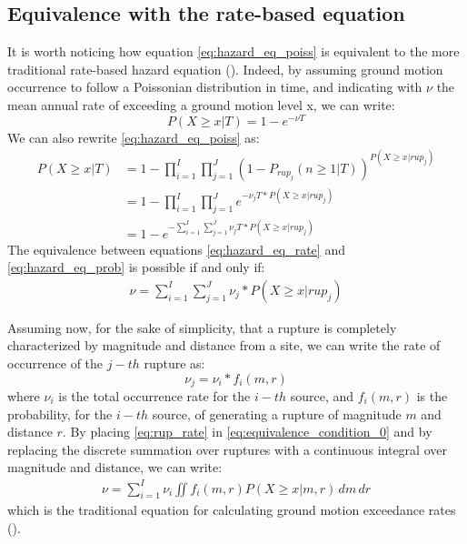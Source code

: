 \subsection{Equivalence with the rate-based equation}
It is worth noticing how equation \ref{eq:hazard_eq_poiss} is equivalent to the more traditional rate-based
hazard equation (\cite{mcguire1995}). Indeed, by assuming ground motion occurrence to follow a Poissonian
distribution in time, and indicating with $\nu$ the mean annual rate of exceeding a ground motion level x,
we can write:
\begin{equation}
\label{eq:hazard_eq_rate}
P(X \ge x | T) = 1 - e ^ {- \nu T}
\end{equation}
We can also rewrite \ref{eq:hazard_eq_poiss} as:
\begin{align}
\label{eq:hazard_eq_prob}
P(X \ge x | T) &= 1 - \prod_{i=1}^{I} \prod_{j=1}^{J} (1 - P_{rup_{j}}(n \ge 1 | T))^{P(X \ge x | rup_{j})} \nonumber \\
		      &= 1 - \prod_{i=1}^{I} \prod_{j=1}^{J} e^{-\nu_{j} T * P(X \ge x | rup_{j})} \nonumber \\
		      & = 1 - e ^ {- \sum_{i=1}^{I} \sum_{j=1}^{J} \nu_{j} T * P(X \ge x | rup_{j})}
\end{align}
The equivalence between equations \ref{eq:hazard_eq_rate} and \ref{eq:hazard_eq_prob} is possible if and only if:
\begin{align}
\label{eq:equivalence_condition_0}
\nu  =  \sum_{i=1}^{I} \sum_{j=1}^{J} \nu_{j} * P(X \ge x | rup_{j})
\end{align}

Assuming now, for the sake of simplicity, that a rupture is completely characterized by magnitude and distance from a site, we
can write the rate of occurrence of the $j-th$ rupture as:
\begin{equation}
\label{eq:rup_rate}
\nu_{j} = \nu_{i} * f_{i}(m, r)
\end{equation}
where $\nu_{i}$ is the total occurrence rate for the $i-th$ source, and $f_{i}(m, r)$ is the probability, for the $i-th$ source, of
generating a rupture of magnitude $m$ and distance $r$. By placing \ref{eq:rup_rate} in \ref{eq:equivalence_condition_0} and
by replacing the discrete summation over ruptures with a continuous integral over magnitude and distance, we can write:
\begin{align}
\nu = \sum_{i=1}^{I} \nu_{i} \iint f_{i}(m, r) P(X \ge x | m, r)\,dm \,dr
\end{align}
which is the traditional equation for calculating ground motion exceedance rates (\cite{mcguire1995}).

